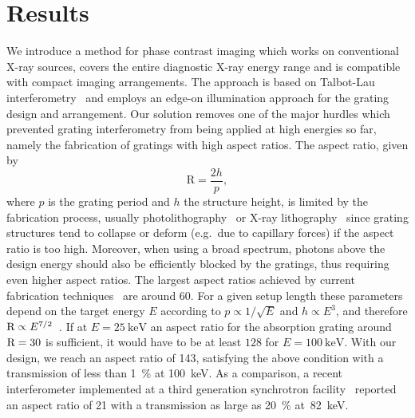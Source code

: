 \section{Results}
We introduce a method for phase contrast imaging which works on
conventional X-ray sources, covers the entire diagnostic X-ray energy range
and is compatible with compact imaging arrangements. The approach is based
on Talbot-Lau interferometry~\cite{Pfeiffer2006} and employs an edge-on
illumination approach for the grating design and arrangement. Our solution
removes one of the major hurdles which prevented grating interferometry from
being applied at high energies so far, namely the fabrication of gratings
with high aspect ratios. The aspect ratio, given by
\begin{equation}
    \text{R} = \frac{2h}{p},
\end{equation}
where $p$ is the
grating period and $h$ the  structure height, is limited by the
fabrication process, usually photolithography~\cite{David2002} or X-ray
lithography~\cite{Mohr2012} since grating structures tend to collapse or deform
(e.g.\ due to capillary forces) if the aspect ratio is too high.
Moreover, when using a broad spectrum, photons above the design energy
should also be efficiently blocked by the gratings, thus requiring even
higher aspect ratios. The largest aspect ratios achieved by current
fabrication techniques~\cite{David2007,Kenntner2010} are around 60.
For a given setup length these parameters depend on the target energy $E$
according to $p \propto 1/\sqrt{E}$ and $h \propto E^3$, and therefore
$\textnormal{R} \propto E^{7/2}$~\cite{Momose2003a}. If at
$E=\SI{25}{\kilo\electronvolt}$ an aspect ratio for the absorption grating
around $\textnormal{R}=30$ is sufficient, it would have to be at least
$\num{128}$ for $E=\SI{100}{\kilo\electronvolt}$. With our design, we reach
an aspect ratio of \num{143}, satisfying the above condition with a
transmission of less than \SI{1}{\percent} at \SI{100}{\kilo\eV}. As a
comparison, a recent interferometer implemented at a third generation
synchrotron facility~\cite{Willner2013} reported an aspect ratio of
\num{21} with a transmission as large as \SI{20}{\percent}
at~\SI{82}{\kilo\eV}.

